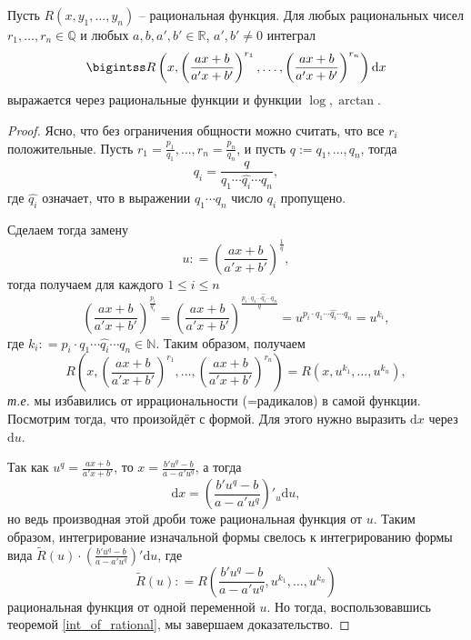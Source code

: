 \begin{theorem}
Пусть $R(x,y_1,\ldots, y_n)$ -- рациональная функция. Для любых рациональных чисел $r_1, \ldots, r_n \in \mathbb{Q}$ и любых $a,b,a',b' \in \mathbb{R}$, $a',b'\ne 0$ интеграл
 \[
  \bigintss R\left(x, \left(\frac{ax+b}{a'x+b'} \right)^{r_1}, \ldots, \left(\frac{ax+b}{a'x+b'} \right)^{r_n} \right)\mathrm{d}x
 \]
 выражается через рациональные функции и функции $\log, \arctan.$
\end{theorem}
\begin{proof}
Ясно, что без ограничения общности можно считать, что все $r_i$ положительные. Пусть $r_1 = \frac{p_1}{q_1}, \ldots, r_n = \frac{p_n}{q_n}$, и пусть $q:=q_1,\ldots, q_n$, тогда
\[
 q_i = \frac{q }{q_1 \cdots \widehat{q_i}\cdots q_n},
\]
где $\widehat{q_i}$ означает, что в выражении $q_1\cdots q_n$ число $q_i$ пропущено.

Сделаем тогда замену 
    \[
     u: = \left(\frac{ax + b}{a'x + b'} \right)^{\frac{1}{q}},
    \]
    тогда получаем для каждого $1\le i \le n$
    \[
    \left( \frac{ax+b}{a'x + b'} \right)^{\frac{p_i}{q_i}} =  \left( \frac{ax+b}{a'x + b'} \right)^{\frac{p_i\cdot q_1 \cdots \widehat{q_i}\cdots q_n}{q}} = u^{p_i\cdot q_1 \cdots \widehat{q_i}\cdots q_n} = u^{k_i},
    \]
где $k_i : = p_i\cdot q_1 \cdots \widehat{q_i}\cdots q_n \in \mathbb{N}$. Таким образом, получаем
\[
 R\left(x, \left(\frac{ax+b}{a'x+b'} \right)^{r_1}, \ldots, \left(\frac{ax+b}{a'x+b'} \right)^{r_n} \right) = R(x,u^{k_1},\ldots, u^{k_n}),
\]
\textit{т.е.} мы избавились от иррациональности (=радикалов) в самой функции. Посмотрим тогда, что произойдёт с формой. Для этого нужно выразить $\mathrm{d}x$ через $\mathrm{d}u.$

Так как $u^q = \frac{ax + b}{a'x+b'}$, то $x = \frac{b'u^q - b}{a - a'u^q}$, а тогда 
\[
 \mathrm{d}x = \left(\frac{b'u^q - b}{a - a'u^q} \right)'_u\mathrm{d}u,
\]
но ведь производная этой дроби тоже рациональная функция от $u$. Таким образом, интегрирование изначальной формы свелось к интегрированию формы вида $\widetilde{R}(u)\cdot\left(\frac{b'u^q - b}{a - a'u^q} \right)'\mathrm{d}u$, где 
\[
 \widetilde{R}(u): = R\left( \frac{b'u^q- b}{a- a'u^q}, u^{k_1}, \ldots, u^{k_n} \right)
\]
рациональная функция от одной переменной $u.$ Но тогда, воспользовавшись теоремой \ref{int_of_rational}, мы завершаем доказательство.
\end{proof}



